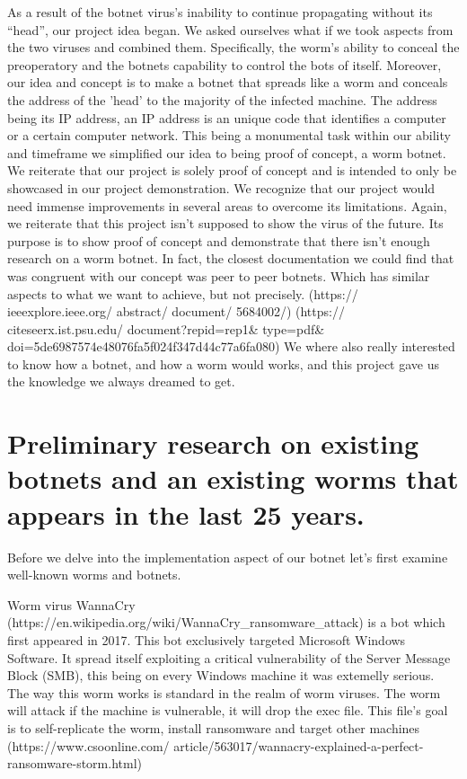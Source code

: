\documentclass[../main.tex]{subfiles}
\begin{document}
    As a result of the botnet virus's inability to continue propagating without its “head”, our project idea began. 
    We asked ourselves what if we took aspects from the two viruses and combined them. 
    Specifically, the worm's ability to conceal the preoperatory and the botnets capability to control the bots of itself. 
    Moreover, our idea and concept is to make a botnet that spreads like a worm and conceals the address of the 'head' to the majority of the infected machine. 
    The address being its IP address, an IP address is an unique code that identifies a computer or a certain computer network. 
    This being a monumental task within our ability and timeframe we simplified our idea to being proof of concept, a worm botnet. 
    We reiterate that our project is solely proof of concept and is intended to only be showcased in our project demonstration. 
    We recognize that our project would need immense improvements in several areas to overcome its limitations. 
    Again, we reiterate that this project isn't supposed to show the virus of the future. 
    Its purpose is to show proof of concept and demonstrate that there isn't enough research on a worm botnet. 
    In fact, the closest documentation we could find that was congruent with our concept was peer to peer botnets. 
    Which has similar aspects to what we want to achieve, but not precisely. (https:// ieeexplore.ieee.org/ abstract/ document/ 5684002/) (https:// citeseerx.ist.psu.edu/ document?repid=rep1\& type=pdf\& doi=5de6987574e48076fa5f024f347d44c77a6fa080) 
    We where also really interested to know how a botnet, and how a worm would works, and this project gave us the knowledge we always dreamed to get.


	\vspace{10pt}
    
    \section{Preliminary research on existing botnets and an existing worms that appears in the last 25 years.}

Before we delve into the implementation aspect of our botnet let's first examine well-known worms and botnets.  

Worm virus WannaCry (https://en.wikipedia.org/wiki/WannaCry\_ransomware\_attack) is a bot which first appeared in 2017.
This bot exclusively targeted Microsoft Windows Software. 
It spread itself exploiting a critical vulnerability of the Server Message Block (SMB), this being on every Windows machine it was extemelly serious. 
The way this worm works is standard in the realm of worm viruses. 
The worm will attack if the machine is vulnerable, it will drop the exec file. 
This file's goal is to self-replicate the worm, install ransomware and target other machines (https://www.csoonline.com/ article/563017/wannacry-explained-a-perfect-ransomware-storm.html) 
\end{document}
